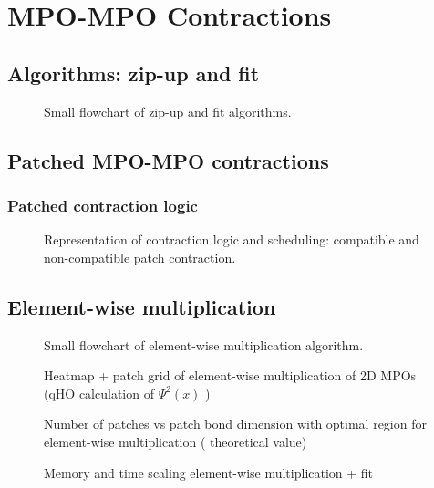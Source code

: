\chapter{MPO-MPO Contractions}
\label{chap:MPOcontr}

\section{Algorithms: zip-up and fit}
\begin{figure}[h!]
    \caption{Small flowchart of zip-up and fit algorithms. }
\end{figure}


\section{Patched MPO-MPO contractions}
\subsection{Patched contraction logic}

\begin{figure}[h!]
    \caption{Representation of contraction logic and scheduling: compatible and non-compatible patch contraction.}
\end{figure}
\section{Element-wise multiplication}

\begin{figure}[h!]
    \caption{Small flowchart of element-wise multiplication algorithm. }
\end{figure}

\begin{figure}[h!]
    \caption{Heatmap + patch grid of element-wise multiplication of 2D MPOs (qHO calculation of $\Psi^2(x)$ ) }
\end{figure}


\begin{figure}[h!]
    \caption{Number of patches vs patch bond dimension with optimal region for element-wise multiplication ( theoretical value) }
\end{figure}

\begin{figure}[h!]
    \caption{Memory and time scaling element-wise multiplication + fit  }
\end{figure}
